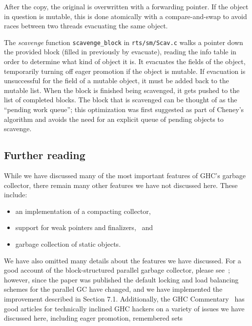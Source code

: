 After the copy, the original is overwritten with a forwarding pointer.
If the object in question is mutable, this is done atomically with a
compare-and-swap to avoid races between two threads evacuating the same
object.

The \emph{scavenge} function \verb|scavenge_block| in
\verb|rts/sm/Scav.c| walks a pointer down the provided block (filled in
previously by evacuate), reading the info table in order to determine
what kind of object it is.  It evacuates the fields of the object,
temporarily turning off eager promotion if the object is mutable.  If
evacuation is unsuccessful for the field of a mutable object, it must be
added back to the mutable list.  When the block is finished being
scavenged, it gets pushed to the list of completed blocks.  The block
that is scavenged can be thought of as the ``pending work queue''; this
optimization was first suggested as part of Cheney's algorithm and
avoids the need for an explicit queue of pending objects to scavenge.

\subsection{Further reading}

While we have discussed many of the most important features of GHC's
garbage collector, there remain many other features we have not
discussed here.  These include:

\begin{itemize}
    \item an implementation of a compacting collector, 
    \item support for weak pointers and finalizers,~\cite{PeytonJones:1999:SSM:647978.743369}  and
    \item garbage collection of static objects. 
\end{itemize}

We have also omitted many details about the features we have discussed.
For a good account of the block-structured parallel garbage collector,
please see~\cite{Marlow:2008:PGG:1375634.1375637}; however, since the
paper was published the default locking and load balancing schemes for
the parallel GC have changed, and we have implemented the improvement
described in Section 7.1.  Additionally, the GHC Commentary~\cite{ghc-gc-commentary} has good
articles for technically inclined GHC hackers on a variety of issues we
have discussed here, including eager promotion, remembered
sets 
